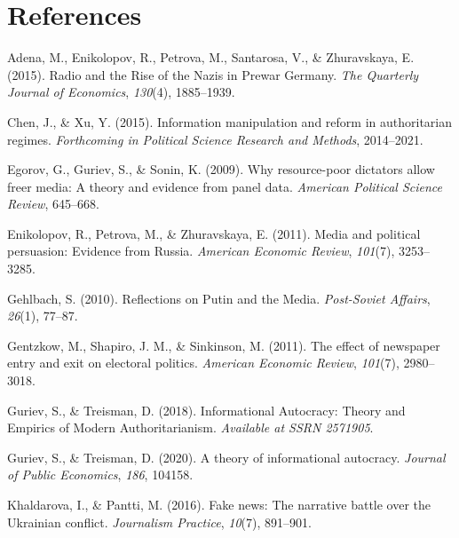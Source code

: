 \documentclass[
  english,
  man]{apa6}
\begin{document}
\newpage

\hypertarget{references}{%
\section{References}\label{references}}

\begingroup
\setlength{\parindent}{-0.5in}
\setlength{\leftskip}{0.5in}

\hypertarget{refs}{}
\leavevmode\hypertarget{ref-adenaRadioRiseNazis2015}{}%
Adena, M., Enikolopov, R., Petrova, M., Santarosa, V., \& Zhuravskaya, E. (2015). Radio and the Rise of the Nazis in Prewar Germany. \emph{The Quarterly Journal of Economics}, \emph{130}(4), 1885--1939.

\leavevmode\hypertarget{ref-chenInformationManipulationReform2015}{}%
Chen, J., \& Xu, Y. (2015). Information manipulation and reform in authoritarian regimes. \emph{Forthcoming in Political Science Research and Methods}, 2014--2021.

\leavevmode\hypertarget{ref-egorovWhyResourcepoorDictators2009}{}%
Egorov, G., Guriev, S., \& Sonin, K. (2009). Why resource-poor dictators allow freer media: A theory and evidence from panel data. \emph{American Political Science Review}, 645--668.

\leavevmode\hypertarget{ref-enikolopovMediaPoliticalPersuasion2011}{}%
Enikolopov, R., Petrova, M., \& Zhuravskaya, E. (2011). Media and political persuasion: Evidence from Russia. \emph{American Economic Review}, \emph{101}(7), 3253--3285.

\leavevmode\hypertarget{ref-gehlbachReflectionsPutinMedia2010}{}%
Gehlbach, S. (2010). Reflections on Putin and the Media. \emph{Post-Soviet Affairs}, \emph{26}(1), 77--87.

\leavevmode\hypertarget{ref-gentzkowEffectNewspaperEntry2011}{}%
Gentzkow, M., Shapiro, J. M., \& Sinkinson, M. (2011). The effect of newspaper entry and exit on electoral politics. \emph{American Economic Review}, \emph{101}(7), 2980--3018.

\leavevmode\hypertarget{ref-gurievInformationalAutocracyTheory2018}{}%
Guriev, S., \& Treisman, D. (2018). Informational Autocracy: Theory and Empirics of Modern Authoritarianism. \emph{Available at SSRN 2571905}.

\leavevmode\hypertarget{ref-gurievTheoryInformationalAutocracy2020}{}%
Guriev, S., \& Treisman, D. (2020). A theory of informational autocracy. \emph{Journal of Public Economics}, \emph{186}, 104158.

\leavevmode\hypertarget{ref-khaldarovaFakeNewsNarrative2016}{}%
Khaldarova, I., \& Pantti, M. (2016). Fake news: The narrative battle over the Ukrainian conflict. \emph{Journalism Practice}, \emph{10}(7), 891--901.
\end{document}
